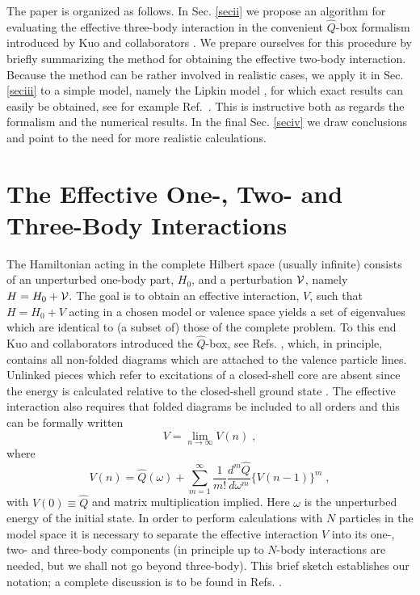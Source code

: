 \documentclass[prc,aps,amsmath,amssymb,preprintnumbers,showpacs,twocolumn]{revtex4}
\begin{document}
The paper is organized as follows. In Sec. \ref{secii} we propose an 
algorithm for evaluating the effective three-body interaction in the 
convenient $\hat{Q}$-box formalism introduced by Kuo and 
collaborators \cite{ko,oslo}. We prepare ourselves for this procedure by 
briefly summarizing the method for obtaining the effective two-body 
interaction. Because the method can be rather involved in 
realistic cases, we apply it in Sec. \ref{seciii} to a simple model,
namely the Lipkin model \cite{LMG65}, for which exact results can easily 
be obtained, see for example Ref.~\cite{vary04}. 
This is instructive both as regards the formalism and the 
numerical results.
In the final Sec. \ref{seciv} we draw 
conclusions and point to the need for more realistic calculations. 


\section{The Effective One-, Two- and Three-Body Interactions\label{secii}}

The Hamiltonian acting in the complete Hilbert space (usually 
infinite) consists of an unperturbed one-body part, $H_0$, and a 
perturbation ${\cal V}$, namely $H=H_0+{\cal V}$. The goal is to obtain
an effective interaction, $V$, such that $H=H_0+V$ acting in a chosen 
model or valence
space yields a set of eigenvalues which are identical to (a subset of)
those of the complete problem. To this end  Kuo and collaborators
introduced the $\hat{Q}$-box, see Refs. \cite{oslo,ko}, which, in 
principle, contains all non-folded diagrams which are attached to
the valence particle lines. Unlinked pieces which refer to excitations 
of a closed-shell core are absent since the energy is calculated relative 
to the closed-shell ground state \cite{bran}. The effective interaction also 
requires that folded diagrams be included to all orders and this can 
be formally written
\begin{equation}
V=\lim_{n\rightarrow\infty}V(n)\;, \label{veff}  %
\end{equation}
where
\begin{equation}
V(n)=\hat{Q}(\omega)+\sum_{m=1}^\infty\frac{1}{m!}\frac{d^m\hat{Q}}
{d\omega^m}\bigl\{V(n-1)\bigr\}^m\;, \label{veff2}  %
\end{equation}
with $V(0)\equiv\hat{Q}$ and matrix multiplication implied.
Here $\omega$ is the unperturbed energy of the initial state. In order
to perform calculations with $N$ particles in the model space it is
necessary to separate the effective interaction $V$ into its one-, two-
and three-body components (in principle up to $N$-body interactions are
needed, but we shall not go beyond three-body). This 
brief sketch establishes our notation; a complete discussion is to be 
found in Refs. \cite{oslo,ko,bran,usrev}. 
\end{document}
